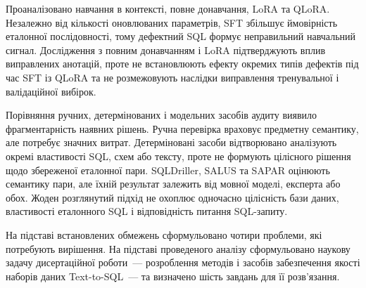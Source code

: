 \documentclass[a4paper,14pt,oneside]{extreport}
\begin{document}
Проаналізовано навчання в контексті, повне донавчання, LoRA та QLoRA. Незалежно від кількості оновлюваних параметрів, SFT збільшує ймовірність еталонної послідовності, тому дефектний SQL формує неправильний навчальний сигнал. Дослідження з повним донавчанням і LoRA підтверджують вплив виправлених анотацій, проте не встановлюють ефекту окремих типів дефектів під час SFT із QLoRA та не розмежовують наслідки виправлення тренувальної і валідаційної вибірок.

Порівняння ручних, детермінованих і модельних засобів аудиту виявило фрагментарність наявних рішень. Ручна перевірка враховує предметну семантику, але потребує значних витрат. Детерміновані засоби відтворювано аналізують окремі властивості SQL, схем або тексту, проте не формують цілісного рішення щодо збереженої еталонної пари. SQLDriller, SALUS та SAPAR оцінюють семантику пари, але їхній результат залежить від мовної моделі, експерта або обох. Жоден розглянутий підхід не охоплює одночасно цілісність бази даних, властивості еталонного SQL і відповідність питання SQL-запиту.

На підставі встановлених обмежень сформульовано чотири проблеми, які потребують вирішення. На підставі проведеного аналізу сформульовано наукову задачу дисертаційної роботи~--- розроблення методів і засобів забезпечення якості наборів даних Text-to-SQL~--- та визначено шість завдань для її розв'язання.



\end{document}
